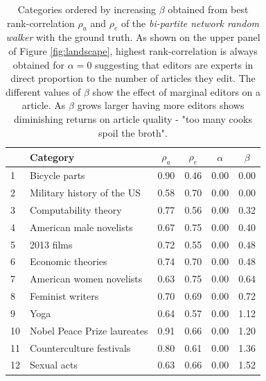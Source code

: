 \begin{table}
\begin{tabular}{|llcccc|}
\hline
         &                     Category & $\rho_a$ & $\rho_e$ & $\alpha$ & $\beta$ \\
\hline
 1&                        Bicycle parts  &     0.90 &     0.46 &     0.00 &    0.00 \\
 2&Military history of the US  &     0.58 &     0.70 &     0.00 &    0.00 \\
  3&                Computability theory &     0.77 &     0.56 &     0.00 &    0.32 \\
   4&            American male novelists &     0.67 &     0.75 &     0.00 &    0.40 \\
    5&                        2013 films  &     0.72 &     0.55 &     0.00 &    0.48 \\
     6&                Economic theories  &     0.74 &     0.70 &     0.00 &    0.48 \\
     7&         American women novelists  &     0.63 &     0.75 &     0.00 &    0.64 \\
     8&                 Feminist writers  &     0.70 &     0.69 &     0.00 &    0.72 \\
     9&                             Yoga  &     0.64 &     0.57 &     0.00 &    1.12 \\
     10&      Nobel Peace Prize laureates  &     0.91 &     0.66 &     0.00 &    1.20 \\
      11&        Counterculture festivals  &     0.80 &     0.61 &     0.00 &    1.36 \\
        12&                   Sexual acts  &     0.63 &     0.66 &     0.00 &    1.52 \\
\hline
\end{tabular}
\caption{Categories ordered by increasing $\beta$ obtained from best rank-correlation $\rho_a$ and  $\rho_e$
 of the {\it bi-partite network random walker} with the ground truth. As shown on the upper panel of Figure \ref{fig:landscape}, highest rank-correlation is always obtained for $\alpha = 0$ suggesting that editors are experts in direct proportion to the number of articles they edit. The different values of $\beta$ show the effect of marginal editors on a article. As $\beta$ grows larger having more editors shows diminishing returns on article quality - "too many cooks spoil the broth".}
\label{tab:maxbeta}
\end{table}


